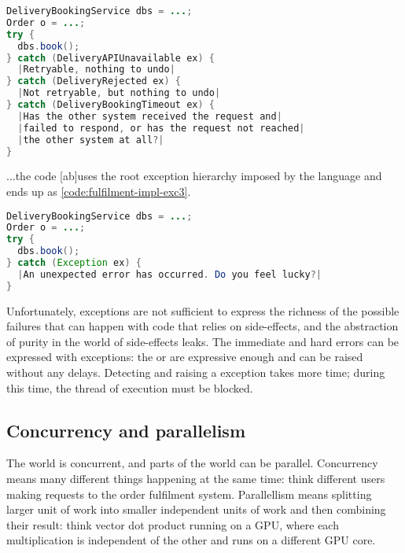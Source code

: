 \documentclass[10 pt, twocolumn]{article}
\begin{document}
\begin{lstlisting}[caption={Exceptions}, label={code:fulfilment-impl-exc2}, language=Java, escapechar=|]
DeliveryBookingService dbs = ...;
Order o = ...;
try {
  dbs.book();
} catch (DeliveryAPIUnavailable ex) { 
  |Retryable, nothing to undo|
} catch (DeliveryRejected ex) {
  |Not retryable, but nothing to undo|
} catch (DeliveryBookingTimeout ex) {
  |Has the other system received the request and|
  |failed to respond, or has the request not reached|
  |the other system at all?|
}
\end{lstlisting}

...the code [ab]uses the root exception hierarchy imposed by the language and ends up as \autoref{code:fulfilment-impl-exc3}.

\begin{lstlisting}[caption={Exceptions}, label={code:fulfilment-impl-exc3}, language=Java, escapechar=|]
DeliveryBookingService dbs = ...;
Order o = ...;
try {
  dbs.book();
} catch (Exception ex) { 
  |An unexpected error has occurred. Do you feel lucky?|
}
\end{lstlisting}

Unfortunately, exceptions are not sufficient to express the richness of the possible failures that can happen with code that relies on side-effects, and the abstraction of purity in the world of side-effects leaks. The immediate and hard errors can be expressed with exceptions: the  or  are expressive enough and can be raised without any delays. Detecting and raising a  exception takes more time; during this time, the thread of execution must be blocked. 

\subsection{Concurrency and parallelism}
The world is concurrent, and parts of the world can be parallel. Concurrency means many different things happening at the same time: think different users making requests to the order fulfilment system. Parallellism means splitting larger unit of work into smaller independent units of work and then combining their result: think vector dot product running on a GPU, where each multiplication is independent of the other and runs on a different GPU core. 

\end{document}
